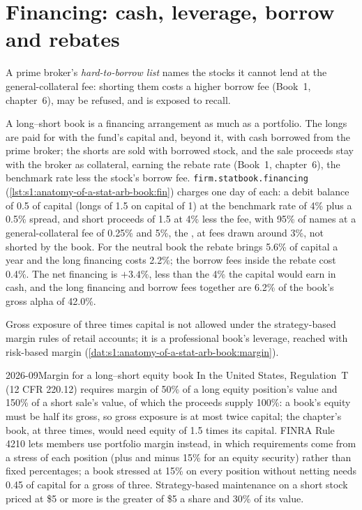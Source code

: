 \section{Financing: cash, leverage, borrow and rebates}

\begin{definition}\label{def:s1:anatomy-of-a-stat-arb-book:htb}
A prime broker's \emph{hard-to-borrow list} names the stocks it cannot lend at the general-collateral fee: shorting them costs a
higher borrow fee (Book~1, chapter~6), may be refused, and is exposed to recall.
\end{definition}

A long--short book is a financing arrangement as much as a portfolio. The longs are paid for with the fund's capital and, beyond it, with cash borrowed from the
prime broker; the shorts are sold with borrowed stock, and the sale proceeds stay with the broker as collateral, earning the rebate rate (Book~1, chapter~6),
the benchmark rate less the stock's borrow fee. \texttt{firm.statbook.financing} (\cref{lst:s1:anatomy-of-a-stat-arb-book:fin}) charges one day of each: a
debit balance of 0.5 of capital (longs of 1.5 on capital of 1) at the benchmark rate of 4\% plus a 0.5\% spread, and short proceeds of 1.5 at 4\% less the fee,
with 95\% of names at a general-collateral fee of 0.25\% and 5\%, the , at fees drawn around 3\%, not shorted by the book. For the neutral
book the rebate brings 5.6\% of capital a year and the long financing costs 2.2\%; the borrow fees inside the rebate cost 0.4\%. The net financing is $+3.4\%$,
less than the 4\% the capital would earn in cash, and the long financing and borrow fees together are 6.2\% of the book's gross alpha of 42.0\%.

Gross exposure of three times capital is not allowed under the strategy-based margin rules of retail accounts; it is a professional book's leverage, reached with
risk-based margin (\cref{dat:s1:anatomy-of-a-stat-arb-book:margin}).

\begin{dated}{2026-09}{Margin for a long--short equity book}\label{dat:s1:anatomy-of-a-stat-arb-book:margin}
In the United States, Regulation~T (12 CFR 220.12) requires margin of 50\% of a long equity position's value and 150\% of a short sale's value, of which the
proceeds supply 100\%: a book's equity must be half its gross, so gross exposure is at most twice capital; the chapter's book, at three times, would need equity of
1.5 times its capital. FINRA Rule 4210 lets members use portfolio margin instead, in which requirements come from a stress of each
position (plus and minus 15\% for an equity security) rather than fixed percentages; a book stressed at 15\% on every position without netting needs 0.45 of
capital for a gross of three. Strategy-based maintenance on a short stock priced at \$5 or more is the greater of \$5 a share and 30\% of its value.
\end{dated}

